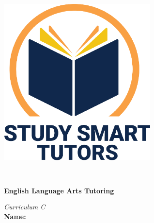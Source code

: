 \documentclass[12pt]{article}
\title{}
\date{}
\begin{document}
\thispagestyle{empty}

\vspace*{\fill}

\vspace*{3cm}

\begin{center}

    \includegraphics[width=0.6\textwidth]{SST_Color_Logo.png} %
    
    \vspace{1cm} %
    
    \Huge \textbf{} \\
    \vspace{0.3cm}
    
    \Huge \textbf{English Language Arts  Tutoring}\\ [0.3cm]
 \vspace{1.5cm}
    
    \LARGE \textit{Curriculum C }\\[1cm] 


    \LARGE \textbf{Name:} \underline{\hspace{8cm}}
    
    
    \vspace{0.5cm}
    
    \vspace{1cm}
   
    
    \vfill %
    
\end{center}
\end{document}
